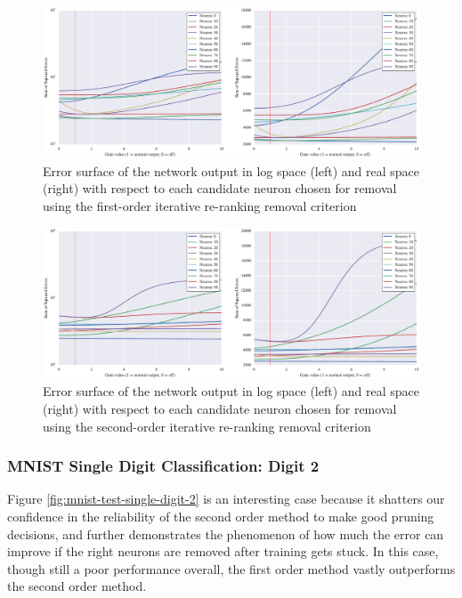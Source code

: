 \begin{figure}[!ht]
\centering
\includegraphics[width=\linewidth]{mnist-test-single-digit-1-g1.pdf}
\caption{Error surface of the network output in log space (left) and real space (right) with respect to each candidate neuron chosen for removal using the first-order iterative re-ranking removal criterion}
\label{fig:mnist-test-single-digit-1-g1}
\end{figure}

\begin{figure}[!ht]
\centering
\includegraphics[width=\linewidth]{mnist-test-single-digit-1-g2.pdf}
\caption{Error surface of the network output in log space (left) and real space (right) with respect to each candidate neuron chosen for removal using the second-order iterative re-ranking removal criterion}
\label{fig:mnist-test-single-digit-1-g2}
\end{figure}

\subsubsection{MNIST Single Digit Classification: Digit 2}

Figure \ref{fig:mnist-test-single-digit-2} is an interesting case because it shatters our confidence in the reliability of the second order method to make good pruning decisions, and further demonstrates the phenomenon of how much the error can improve if the right neurons are removed after training gets stuck. In this case, though still a poor performance overall, the first order method vastly outperforms the second order method. 

